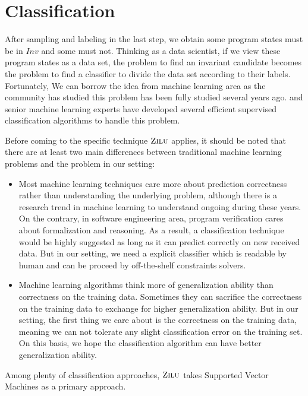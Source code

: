 
\section{Classification} %
\label{sec:classification}

After sampling and labeling in the last step, we obtain some program states must be in $Inv$ and some must not. 
Thinking as a data scientist, if we view these program states as a data set, 
the problem to find an invariant candidate becomes the problem to find a classifier to divide the data set according to their labels.
Fortunately, We can borrow the idea from machine learning area as the community has studied this problem has been fully studied several years ago.
and senior machine learning experts have developed several efficient supervised classification algorithms to handle this problem.

Before coming to the specific technique $\textsc{Zilu}$ applies,
it should be noted that there are at least two main differences between traditional machine learning problems and the problem in our setting:
\begin{itemize}
\item Most machine learning techniques care more about prediction correctness rather than understanding the underlying problem,
although there is a research trend in machine learning to understand ongoing during these years.
On the contrary, in software engineering area, program verification cares about formalization and reasoning.
As a result, a classification technique would be highly suggested as long as it can predict correctly on new received data.
But in our setting, we need a explicit classifier which is readable by human and can be proceed by off-the-shelf constraints solvers.
\item Machine learning algorithms think more of generalization ability than correctness on the training data.
Sometimes they can sacrifice the correctness on the training data to exchange for higher generalization ability.
But in our setting, the first thing we care about is the correctness on the training data,
meaning we can not tolerate any slight classification error on the training set.
On this basis, we hope the classification algorithm can have better generalization ability.
\end{itemize} 

Among plenty of classification approaches, $\textsc{Zilu}$ takes Supported Vector Machines as a primary approach.

